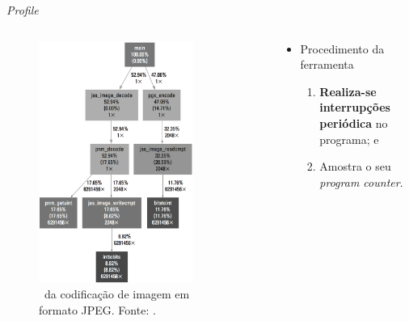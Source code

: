       \begin{frame}{\textit{Profile}} \vspace{-1em}
         
         \begin{columns}
            \begin{column}{0.5\textwidth}
               
               \begin{figure}[h] \centering
                  \vspace{-24pt}
                  \includegraphics[width=0.8\textwidth]{img/f4-1-2.png}
                  \caption{\Profile\ da codificação de imagem em formato JPEG. Fonte: \cite{Sass2010}.}
               \end{figure}
            \end{column}
            \begin{column}{0.5\textwidth}
               \vspace{-1cm}
               \begin{itemize}
                  \item Procedimento da ferramenta
                  \begin{enumerate}
                     \setlength{\itemsep}{0.8em}
                     \item \textbf{Realiza-se interrupções periódica} no programa; e
                     \item Amostra o seu \textit{program counter}.
                     

\end{enumerate}
\end{itemize}
\end{column}
\end{columns}
\end{frame}
